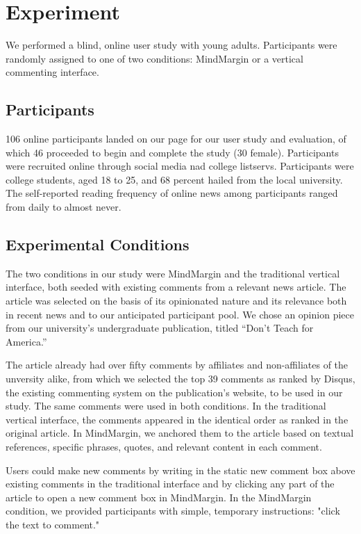 \section{Experiment}

We performed a blind, online user study with young adults. Participants were randomly assigned to one of two conditions: MindMargin or a vertical commenting interface.

\subsection{Participants}
106 online participants landed on our page for our user study and evaluation, of which 46 proceeded to begin and complete the study (30 female). Participants were recruited online through social media nad college listservs. Participants were college students, aged 18 to 25, and 68 percent hailed from the local university. The self-reported reading frequency of online news among participants ranged from daily to almost never. 

\subsection{Experimental Conditions}
The two conditions in our study were MindMargin and the traditional vertical interface, both seeded with existing comments from a relevant news article. The article was selected on the basis of its opinionated nature and its relevance both in recent news and to our anticipated participant pool. We chose an opinion piece from our university's undergraduate publication, titled “Don’t Teach for America.” 

The article already had over fifty comments by affiliates and non-affiliates of the unversity alike, from which we selected the top 39 comments as ranked by Disqus, the existing commenting system on the publication's website, to be used in our study. The same comments were used in both conditions. In the traditional vertical interface, the comments appeared in the identical order as ranked in the original article. In MindMargin, we anchored them to the article based on textual references, specific phrases, quotes, and relevant content in each comment. 

Users could make new comments by writing in the static new comment box above existing comments in the traditional interface and by clicking any part of the article to open a new comment box in MindMargin. In the MindMargin condition, we provided participants with simple, temporary instructions: "click the text to comment."

